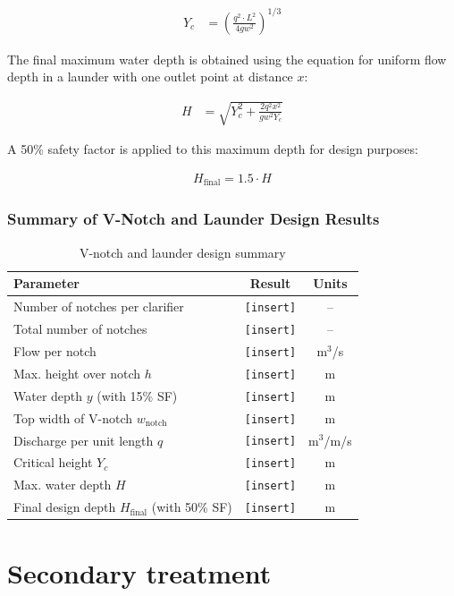 \documentclass[12pt]{article}
\begin{document}
\begin{align}
Y_c &= \left( \frac{q^2 \cdot L^2}{4 g w^2} \right)^{1/3}
\end{align}

The final maximum water depth is obtained using the equation for uniform flow depth in a launder with one outlet point at distance \( x \):

\begin{align}
H &= \sqrt{Y_c^2 + \frac{2 q^2 x^2}{g w^2 Y_c}}
\end{align}

A 50\% safety factor is applied to this maximum depth for design purposes:

\begin{align}
H_{\text{final}} = 1.5 \cdot H
\end{align}

\subsubsection*{Summary of V-Notch and Launder Design Results}

\begin{table}[h]
\centering
\caption{V-notch and launder design summary}
\label{tab:vnotch_results}
\begin{tabular}{|l|c|c|}
\hline
\textbf{Parameter} & \textbf{Result} & \textbf{Units} \\
\hline
Number of notches per clarifier & \texttt{[insert]} & -- \\
Total number of notches & \texttt{[insert]} & -- \\
Flow per notch & \texttt{[insert]} & m$^3$/s \\
Max. height over notch $h$ & \texttt{[insert]} & m \\
Water depth $y$ (with 15\% SF) & \texttt{[insert]} & m \\
Top width of V-notch $w_{\text{notch}}$ & \texttt{[insert]} & m \\
Discharge per unit length $q$ & \texttt{[insert]} & m$^3$/m/s \\
Critical height $Y_c$ & \texttt{[insert]} & m \\
Max. water depth $H$ & \texttt{[insert]} & m \\
Final design depth $H_{\text{final}}$ (with 50\% SF) & \texttt{[insert]} & m \\
\hline
\end{tabular}
\end{table}


\section{Secondary treatment}
\label{sec:secondary_trat}
\newpage
\end{document}
